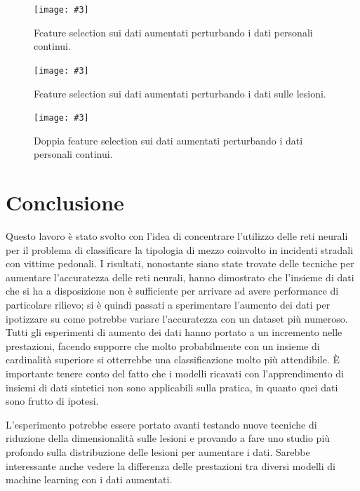 \documentclass[12pt, twoside, letterpaper]{report}
\newcommand{\img}[4] {
	\begin{figure}
		\centering
		\texttt{[image: \#3]}\\
		\caption{#1}
		\label{fig:#4}
	\end{figure}
}
\begin{document}
			\img{Feature selection sui dati aumentati perturbando i dati personali continui.}{0.5}{feature_selection_1.png}{feature_selection_1}
			\img{Feature selection sui dati aumentati perturbando i dati sulle lesioni.}{0.5}{feature_selection_2.png}{feature_selection_2}
			\img{Doppia feature selection sui dati aumentati perturbando i dati personali continui.}{0.5}{feature_selection_doppia.png}{feature_selection_doppia}

			
			
	\chapter*{Conclusione}	  
		Questo lavoro è stato svolto con l'idea di concentrare l'utilizzo delle reti neurali per il problema di classificare la tipologia di mezzo coinvolto in incidenti stradali con vittime pedonali. I risultati, nonostante siano state trovate delle tecniche per aumentare l'accuratezza delle reti neurali, hanno dimostrato che l'insieme di dati che si ha a disposizione non è sufficiente per arrivare ad avere performance di particolare rilievo; si è quindi passati a sperimentare l'aumento dei dati per ipotizzare su come potrebbe variare l'accuratezza con un dataset più numeroso. Tutti gli esperimenti di aumento dei dati hanno portato a un incremento nelle prestazioni, facendo supporre che molto probabilmente con un insieme di cardinalità superiore si otterrebbe una classificazione molto più attendibile. È importante tenere conto del fatto che i modelli ricavati con l'apprendimento di insiemi di dati sintetici non sono applicabili sulla pratica, in quanto quei dati sono frutto di ipotesi.
		
		L'esperimento potrebbe essere portato avanti testando nuove tecniche di riduzione della dimensionalità sulle lesioni e provando a fare uno studio più profondo sulla distribuzione delle lesioni per aumentare i dati. Sarebbe interessante anche vedere la differenza delle prestazioni tra diversi modelli di machine learning con i dati aumentati.
		
\end{document}
